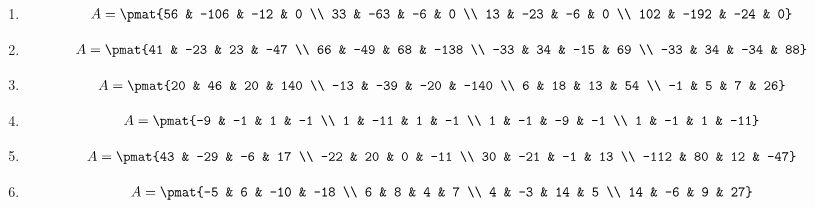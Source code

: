 \begin{enumerate}
\item

\begin{align*}
A = \pmat{56 & -106 & -12 & 0 \\ 33 & -63 & -6 & 0 \\ 13 & -23 & -6 & 0 \\ 102 & -192 & -24 & 0}
\end{align*}

\item

\begin{align*}
A = \pmat{41 & -23 & 23 & -47 \\ 66 & -49 & 68 & -138 \\ -33 & 34 & -15 & 69 \\ -33 & 34 & -34 & 88}
\end{align*}

\item

\begin{align*}
A = \pmat{20 & 46 & 20 & 140 \\ -13 & -39 & -20 & -140 \\ 6 & 18 & 13 & 54 \\ -1 & 5 & 7 & 26}
\end{align*}

\item

\begin{align*}
A = \pmat{-9 & -1 & 1 & -1 \\ 1 & -11 & 1 & -1 \\ 1 & -1 & -9 & -1 \\ 1 & -1 & 1 & -11}
\end{align*}

\item

\begin{align*}
A = \pmat{43 & -29 & -6 & 17 \\ -22 & 20 & 0 & -11 \\ 30 & -21 & -1 & 13 \\ -112 & 80 & 12 & -47}
\end{align*}

\item

\begin{align*}
A = \pmat{-5 & 6 & -10 & -18 \\ 6 & 8 & 4 & 7 \\ 4 & -3 & 14 & 5 \\ 14 & -6 & 9 & 27}
\end{align*}


\end{enumerate}
